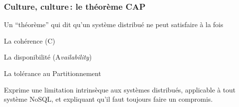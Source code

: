 \begin{frame}
\frametitle{Culture, culture\,: le théorème CAP}

Un ``théorème'' qui dit qu'un système distribué ne peut satisfaire à la fois

\begin{redbullet}
  \item La cohérence (\alert{C})
  
  \item La disponibilité (\alert{A}\textit{vailability})
   \item La tolérance au  \alert{P}artitionnement 
  
\end{redbullet}

Exprime une limitation intrinsèque aux systèmes distribués, applicable à tout système
NoSQL, et expliquant qu'il faut toujours faire un compromis.

\end{frame}





